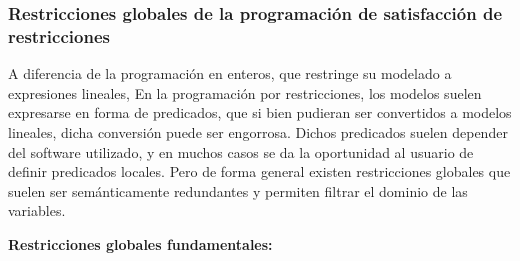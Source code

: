 \documentclass[runningheads]{llncs}
\begin{document}
\subsubsection{Restricciones globales de la programación de satisfacción de restricciones\\}

A diferencia de la programación en enteros, que restringe su modelado a expresiones lineales, En la programación por restricciones, los modelos suelen expresarse en forma de predicados, que si bien pudieran ser convertidos a modelos lineales, dicha conversión puede ser engorrosa. Dichos predicados suelen depender del software utilizado, y en muchos casos se da la oportunidad al usuario de definir predicados locales. Pero de forma general existen restricciones globales que suelen ser semánticamente redundantes y permiten filtrar el dominio de las variables.


\textbf{Restricciones globales fundamentales:}\\
\end{document}
